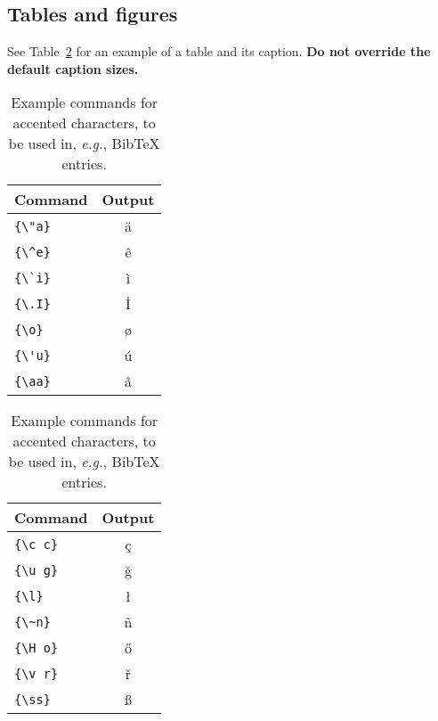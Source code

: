 \documentclass[11pt]{article}
\begin{document}
    \subsection{Tables and figures}

    See Table~\ref{tab:accents} for an example of a table and its caption.
    \textbf{Do not override the default caption sizes.}

    \begin{table}
        \centering
        \begin{tabular}{lc}
            \hline
            \textbf{Command} & \textbf{Output} \\
            \hline
            \verb|{\"a}|     & {\"a}           \\
            \verb|{\^e}|     & {\^e}           \\
            \verb|{\`i}|     & {\`i}           \\
            \verb|{\.I}|     & {\.I}           \\
            \verb|{\o}|      & {\o}            \\
            \verb|{\'u}|     & {\'u}           \\
            \verb|{\aa}|     & {\aa}           \\\hline
        \end{tabular}
        \begin{tabular}{lc}
            \hline
            \textbf{Command} & \textbf{Output} \\
            \hline
            \verb|{\c c}|    & {\c c}          \\
            \verb|{\u g}|    & {\u g}          \\
            \verb|{\l}|      & {\l}            \\
            \verb|{\~n}|     & {\~n}           \\
            \verb|{\H o}|    & {\H o}          \\
            \verb|{\v r}|    & {\v r}          \\
            \verb|{\ss}|     & {\ss}           \\
            \hline
        \end{tabular}
        \caption{Example commands for accented characters, to be used in, \emph{e.g.}, Bib\TeX{} entries.}
        \label{tab:accents}
    \end{table}


    
    



\end{document}
